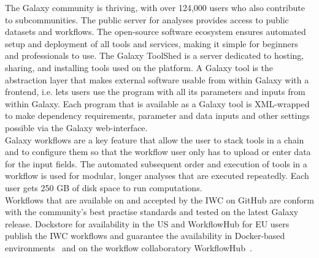 The Galaxy community is thriving, with over 124,000 users who also contribute to subcommunities. The public server for analyses provides access to public datasets and workflows. The open-source software ecosystem ensures automated setup and deployment of all tools and services, making it simple for beginners and professionals to use. The Galaxy ToolShed is a server dedicated to hosting, sharing, and installing tools used on the platform. A Galaxy tool is the abstraction layer that makes external software usable from within Galaxy with a frontend, i.e. lets users use the program with all its parameters and inputs from within Galaxy. Each program that is available as a Galaxy tool is XML-wrapped to make dependency requirements, parameter and data inputs and other settings possible via the Galaxy web-interface. \\ 
Galaxy workflows are a key feature that allow the user to stack tools in a chain and to configure them so that the workflow user only has to upload or enter data for the input fields. The automated subsequent order and execution of tools in a workflow is used for modular, longer analyses that are executed repeatedly. Each user gets 250 GB of disk space to run computations. \\
Workflows that are available on and accepted by the \ac{IWC} on GitHub are conform with the community's best practise standards and tested on the latest Galaxy release. Dockstore for availability in the US and WorkflowHub for EU users  publish the \ac{IWC} workflows and guarantee the availability in Docker-based environments~\cite{o2017dockstore} and on the workflow collaboratory WorkflowHub~\cite{goble2021implementing}.


